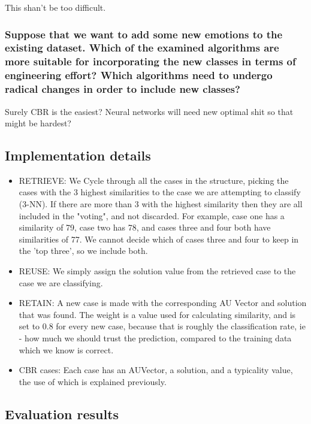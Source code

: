 \documentclass[12pt]{article}
\begin{document}
This shan't be too difficult.

\subsubsection*{Suppose that we want to add some new emotions to the existing dataset. Which of the examined algorithms are more suitable for incorporating the new classes in terms of engineering effort? Which algorithms need to undergo radical changes in order to include new classes?}

Surely CBR is the easiest? Neural networks will need new optimal shit so that might be hardest?

\subsection*{Implementation details}
\begin{itemize}
  \item RETRIEVE:
    We Cycle through all the cases in the structure, picking the cases with the 3 highest similarities to the case we are attempting to classify (3-NN). If there are more than 3 with the highest similarity then they are all included in the "voting", and not discarded. For example, case one has a similarity of 79, case two has 78, and cases three and four both have similarities of 77. We cannot decide which of cases three and four to keep in the 'top three', so we include both.
  \item REUSE:
    We simply assign the solution value from the retrieved case to the case we are classifying.
  \item RETAIN:
    A new case is made with the corresponding AU Vector and solution that was found. The weight is a value used for calculating similarity, and is set to 0.8 for every new case, because that is roughly the classification rate, ie - how much we should trust the prediction, compared to the training data which we know is correct.
  \item CBR cases:
    Each case has an AUVector, a solution, and a typicality value, the use of which is explained previously.
\end{itemize}

\subsection*{Evaluation results}
\end{document}

